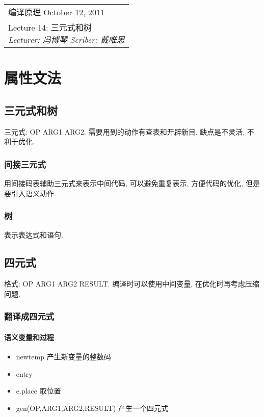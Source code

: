 \def\lecture{14}
\clearpage \noindent\begin{tabularx}{\linewidth}{|X|}
\hline \vskip -2mm
{\sf 编译原理} \hfill October 12, 2011 \\
{\centering \sf \large Lecture \lecture:
三元式和树 \\ }
\textsl{Lecturer: 冯博琴 \hfill Scriber: 戴唯思}\\ \hline
\end{tabularx}
\setcounter{section}{0}
\renewcommand{\thepage}{\lecture -\arabic{page}}

\section{属性文法}

    \subsection{三元式和树}

        三元式: OP ARG1 ARG2. 需要用到的动作有查表和开辟新目. 缺点是不灵活, 不利于优化.

        \subsubsection{间接三元式}

            用间接码表辅助三元式来表示中间代码, 可以避免重复表示, 方便代码的优化, 但是要引入语义动作.

        \subsubsection{树}

            表示表达式和语句.

    \subsection{四元式}

        格式: OP ARG1 ARG2 RESULT. 编译时可以使用中间变量, 在优化时再考虑压缩问题.

        \subsubsection{翻译成四元式}

            \paragraph{语义变量和过程}
            \begin{itemize}
                \item newtemp 产生新变量的整数码
                \item entry
                \item e.place 取位置
                \item gen(OP,ARG1,ARG2,RESULT) 产生一个四元式
            \end{itemize}

